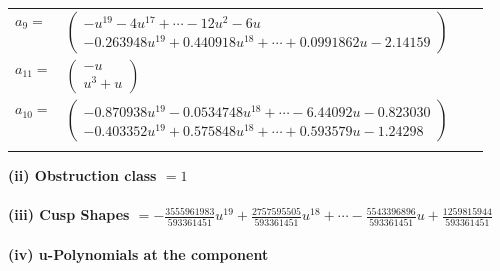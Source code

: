 \documentclass[1p]{elsarticle_modified}
\theoremstyle{definition}
\begin{document}
\begin{tabular}{m{7pt} m{180pt} m{7pt} m{180pt} }
\flushright $a_{9}=$&$\begin{pmatrix}- u^{19}-4 u^{17}+\cdots-12 u^2-6 u\\-0.263948 u^{19}+0.440918 u^{18}+\cdots+0.0991862 u-2.14159\end{pmatrix}$ \\
\flushright $a_{11}=$&$\begin{pmatrix}- u\\u^3+u\end{pmatrix}$ \\
\flushright $a_{10}=$&$\begin{pmatrix}-0.870938 u^{19}-0.0534748 u^{18}+\cdots-6.44092 u-0.823030\\-0.403352 u^{19}+0.575848 u^{18}+\cdots+0.593579 u-1.24298\end{pmatrix}$\\&\end{tabular}
\flushleft \textbf{(ii) Obstruction class $= 1$}\\~\\
\flushleft \textbf{(iii) Cusp Shapes $= -\frac{3555961983}{593361451} u^{19}+\frac{2757595505}{593361451} u^{18}+\cdots-\frac{5543396896}{593361451} u+\frac{1259815944}{593361451}$}\\~\\
\newpage\renewcommand{\arraystretch}{1}
\flushleft \textbf{(iv) u-Polynomials at the component}\newline \\
\end{document}
